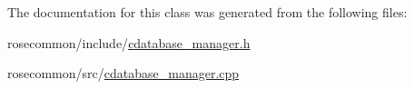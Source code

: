The documentation for this class was generated from the following files\+:\begin{DoxyCompactItemize}
\item 
rosecommon/include/\hyperlink{cdatabase__manager_8h}{cdatabase\+\_\+manager.\+h}\item 
rosecommon/src/\hyperlink{cdatabase__manager_8cpp}{cdatabase\+\_\+manager.\+cpp}\end{DoxyCompactItemize}
